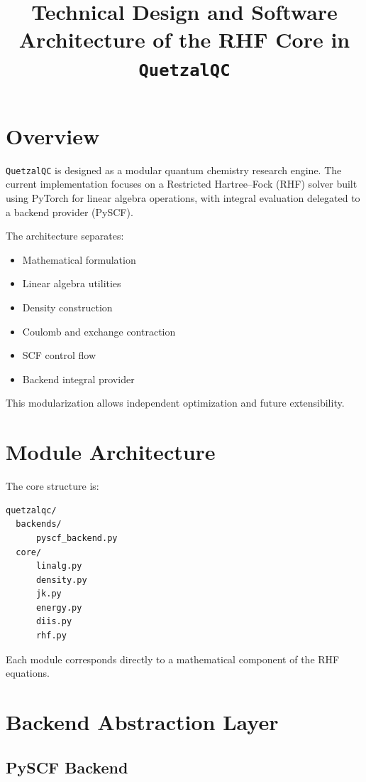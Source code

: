 \documentclass[11pt]{article}
\title{Technical Design and Software Architecture of the RHF Core in \texttt{QuetzalQC}}
\author{}
\date{}
\begin{document}
\maketitle

\section{Overview}

\texttt{QuetzalQC} is designed as a modular quantum chemistry research engine.
The current implementation focuses on a Restricted Hartree--Fock (RHF) solver
built using PyTorch for linear algebra operations, with integral evaluation
delegated to a backend provider (PySCF).

The architecture separates:

\begin{itemize}
\item Mathematical formulation
\item Linear algebra utilities
\item Density construction
\item Coulomb and exchange contraction
\item SCF control flow
\item Backend integral provider
\end{itemize}

This modularization allows independent optimization and future extensibility.

\section{Module Architecture}

The core structure is:

\begin{verbatim}
quetzalqc/
  backends/
      pyscf_backend.py
  core/
      linalg.py
      density.py
      jk.py
      energy.py
      diis.py
      rhf.py
\end{verbatim}

Each module corresponds directly to a mathematical component of the RHF equations.

\section{Backend Abstraction Layer}

\subsection{PySCF Backend}
\end{document}
